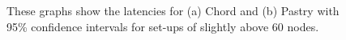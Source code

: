 \begin{figure}[!htb]
  \centering
  \caption{These graphs show the latencies for (a) Chord and (b) Pastry with 95\% confidence intervals for set-ups of slightly above 60 nodes.}
\end{figure}

